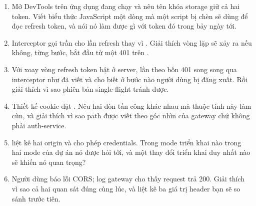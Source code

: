 \begin{quiz}
\begin{enumerate}
  \item Mở DevTools trên ứng dụng đang chạy và nêu tên khóa storage giữ
  cả hai token. Viết biểu thức JavaScript một dòng mà một script bị
  chèn sẽ dùng để đọc refresh token, và nói nó làm được gì với token
  đó trong bảy ngày tới.
  \item Interceptor gọi  trần cho lần refresh thay vì
  . Giải thích vòng lặp sẽ xảy ra nếu không, từng bước,
  bắt đầu từ một 401 trên .
  \item Với xoay vòng refresh token bật ở server, lần theo bốn 401 song
  song qua interceptor như đã viết và cho biết ở bước nào người dùng bị
  đăng xuất. Rồi giải thích vì sao phiên bản single-flight tránh được.
  \item Thiết kế cookie đặt . Nêu hai đòn
  tấn công khác nhau mà thuộc tính này làm cùn, và giải thích vì sao
  path được viết theo góc nhìn của gateway chứ không phải auth-service.
  \item {} liệt kê hai origin và cho phép credentials.
  Trong mode triển khai nào trong hai mode của dự án nó được hỏi tới,
  và một thay đổi triển khai duy nhất nào sẽ khiến nó quan trọng?
  \item Người dùng báo lỗi CORS; log gateway cho thấy request trả 200.
  Giải thích vì sao cả hai quan sát đúng cùng lúc, và liệt kê ba giá
  trị header bạn sẽ so sánh trước tiên.
\end{enumerate}
\end{quiz}
